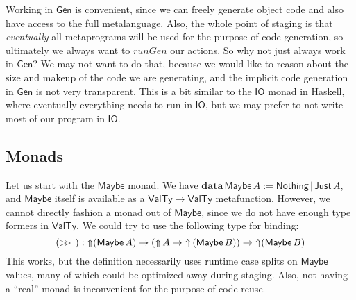 \documentclass[acmsmall,screen,review,anonymous]{acmart}
\newcommand{\mit}[1]{\mathit{#1}}
\newcommand{\msf}[1]{\mathsf{#1}}
\newcommand{\mbf}[1]{\mathbf{#1}}
\newcommand{\data}{\mbf{data}\,}
\newcommand{\Up}{{\Uparrow}}
\newcommand{\bind}{\mathbin{>\!\!>\mkern-6.7mu=}}
\newcommand{\VTy}{\msf{ValTy}}
\newcommand{\Maybe}{\msf{Maybe}}
\newcommand{\Nothing}{\msf{Nothing}}
\newcommand{\Just}{\msf{Just}}
\theoremstyle{remark}
\newcommand{\Gen}{\msf{Gen}}
\newcommand{\runGen}{\mit{runGen}}
\begin{document}
Working in $\Gen$ is convenient, since we can freely generate object code and
also have access to the full metalanguage. Also, the whole point of staging is
that \emph{eventually} all metaprograms will be used for the purpose of code
generation, so ultimately we always want to $\runGen$ our actions. So why not
just always work in $\Gen$? We may not want to do that, because we would like to
reason about the size and makeup of the code we are generating, and the
implicit code generation in $\Gen$ is not very transparent. This is a bit
similar to the $\msf{IO}$ monad in Haskell, where eventually everything needs
to run in $\msf{IO}$, but we may prefer to not write most of our program in
$\msf{IO}$.

\subsection{Monads}\label{sec:monads}

Let us start with the $\Maybe$ monad. We have $\data \Maybe\,A :=
\Nothing\,|\,\Just\,A$, and $\Maybe$ itself is available as a $\VTy \to \VTy$
metafunction. However, we cannot directly fashion a monad out of $\Maybe$, since
we do not have enough type formers in $\VTy$. We could try to use the following
type for binding:
\[ (\bind) : \Up(\Maybe\,A) \to (\Up\,A \to \Up\,(\Maybe\,B)) \to \Up(\Maybe\,B) \]
This works, but the definition necessarily uses runtime case splits on $\Maybe$
values, many of which could be optimized away during staging. Also, not having
a ``real'' monad is inconvenient for the purpose of code reuse.
\end{document}
